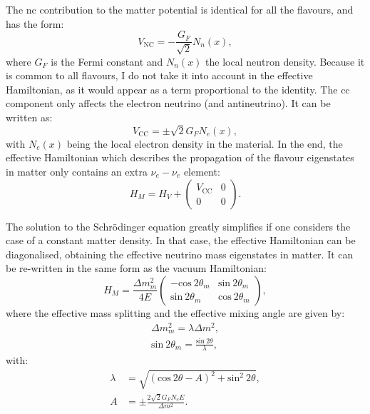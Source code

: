 The \gls{nc} contribution to the matter potential is identical for all the flavours, and has the form:
\begin{equation}
	V_{\mathrm{NC}} = -\frac{G_{F}}{\sqrt{2}} N_{n}(x),
\end{equation}
where $G_{F}$ is the Fermi constant and $N_{n}(x)$ the local neutron density. Because it is common to all flavours, I do not take it into account in the effective Hamiltonian, as it would appear as a term proportional to the identity. The \gls{cc} component only affects the electron neutrino (and antineutrino). It can be written as:
\begin{equation}
	V_{\mathrm{CC}} = \pm \sqrt{2} G_{F} N_{e}(x),
\end{equation}
with $N_{e}(x)$ being the local electron density in the material. In the end, the effective Hamiltonian which describes the propagation of the flavour eigenstates in matter only contains an extra $\nu_{e}-\nu_{e}$ element:
\begin{equation}
	H_{M} = H_{V} + \begin{pmatrix}V_{\mathrm{CC}}&0\\0&0\end{pmatrix}.
\end{equation}

The solution to the Schrödinger equation greatly simplifies if one considers the case of a constant matter density. In that case, the effective Hamiltonian can be diagonalised, obtaining the effective neutrino mass eigenstates in matter. It can be re-written in the same form as the vacuum Hamiltonian:
\begin{equation}
	H_{M} = \frac{\Delta m_{m}^{2}}{4E} \begin{pmatrix}-\mathrm{cos}~2\theta_{m}&\mathrm{sin}~2\theta_{m}\\\mathrm{sin}~2\theta_{m}&\mathrm{cos}~2\theta_{m}\end{pmatrix},
\end{equation}
where the effective mass splitting and the effective mixing angle are given by:
\begin{equation}
	\begin{split}
		\Delta m_{m}^{2} = \lambda \Delta m^{2},\\
		\mathrm{sin}~2\theta_{m} = \frac{\mathrm{sin}~2\theta}{\lambda},
	\end{split}
\end{equation}
with:
\begin{equation}
	\begin{split}
		\lambda &= \sqrt{(\mathrm{cos}~2\theta - A)^{2} + \mathrm{sin}^{2}~2\theta},\\
		A &= \pm \frac{2\sqrt{2}G_{F}N_{e}E}{\Delta m^{2}}.
	\end{split}
\end{equation}

